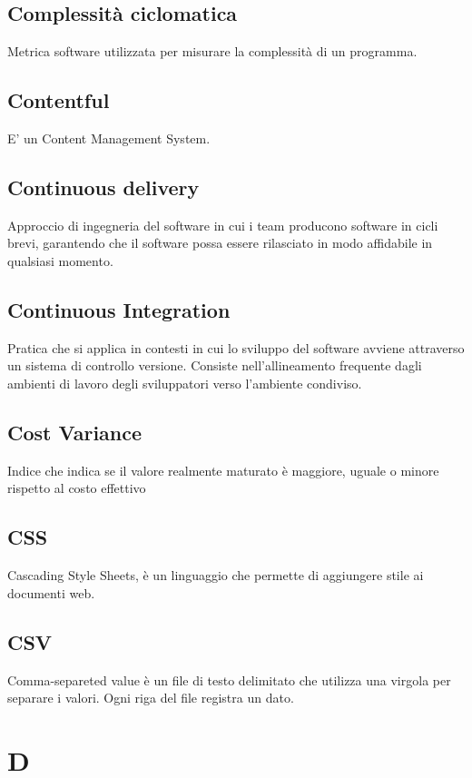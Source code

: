 \subsection*{Complessità ciclomatica}
Metrica software utilizzata per misurare la complessità di un programma.

\subsection*{Contentful}
E' un Content Management System.

\subsection*{Continuous delivery}
Approccio di ingegneria del software in cui i team producono software in cicli brevi, garantendo che il software possa essere rilasciato in modo affidabile in qualsiasi momento.

\subsection*{Continuous Integration}
Pratica che si applica in contesti in cui lo sviluppo del software avviene attraverso un sistema di controllo versione. Consiste nell'allineamento frequente dagli ambienti di lavoro degli sviluppatori verso l'ambiente condiviso.

\subsection*{Cost Variance}
Indice che indica se il valore realmente maturato è maggiore, uguale o minore rispetto al costo effettivo

\subsection*{CSS}
Cascading Style Sheets, è un linguaggio che permette di aggiungere stile ai documenti web.

\subsection*{CSV}
Comma-separeted value è un file di testo delimitato che utilizza una virgola per separare i valori. Ogni riga del file registra un dato.

\newpage
\section{D}
